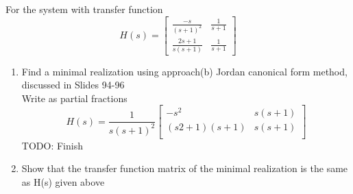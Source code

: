 \item For the system with transfer function 
  \begin{equation}
    H(s) =
    \begin{bmatrix}
      \frac{-s}{(s+1)^2} & \frac 1 {s+1} \\
      \frac {2s+1}{s(s+1)} & \frac 1 {s+1}
    \end{bmatrix}
  \end{equation}
  \begin{enumerate}
  \item Find a minimal realization using approach(b) Jordan canonical form method, discussed in Slides 94-96\\
    Write as partial fractions
    \begin{equation}
      H(s) = \frac 1 {s(s+1)^2}
      \begin{bmatrix}
        -s^2 & s(s+1)\\
        (s2+1)(s+1) & s(s+1)\\ 
      \end{bmatrix}
    \end{equation}
    {\LARGE \color{red} TODO: Finish}
  \item Show that the transfer function matrix of the minimal realization is the same as H(s) given above
  \end{enumerate}